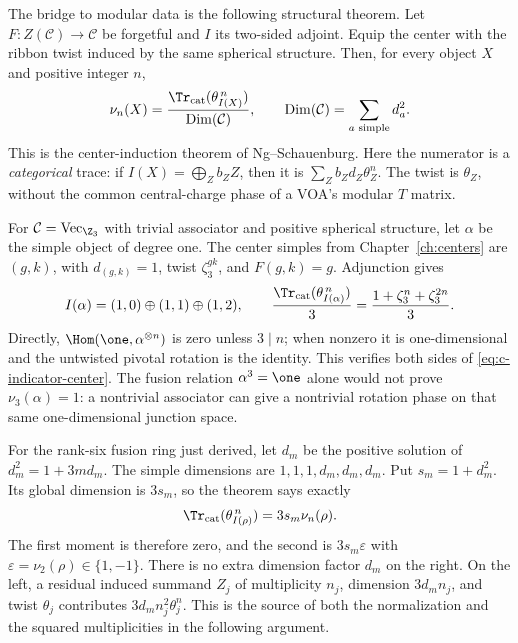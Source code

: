 The bridge to modular data is the following structural theorem.
Let $F:Z(\mathcal C)\to\mathcal C$ be forgetful and $I$ its
two-sided adjoint. Equip the center with the ribbon twist induced
by the same spherical structure. Then, for every object $X$ and
positive integer $n$,
\begin{equation}\label{eq:c-indicator-center}
 \nu_n(X)
 =\frac{\Tr_{\mathrm{cat}}(\theta_{I(X)}^{\,n})}
        {\operatorname{Dim}(\mathcal C)},\qquad
 \operatorname{Dim}(\mathcal C)=\sum_{a\text{ simple}}d_a^2.
\end{equation}
This is the center-induction theorem of Ng--Schauenburg. Here the
numerator is a \emph{categorical} trace: if
$I(X)=\bigoplus_Z b_ZZ$, then it is
$\sum_Z b_Zd_Z\theta_Z^n$. The twist is $\theta_Z$, without the
common central-charge phase of a VOA's modular $T$ matrix.

\begin{example}
For $\mathcal C=\operatorname{Vec}_{\Z_3}$ with trivial associator
and positive spherical structure, let $\alpha$ be the simple object
of degree one. The center simples from Chapter~\ref{ch:centers}
are $(g,k)$, with $d_{(g,k)}=1$, twist $\zeta_3^{gk}$, and
$F(g,k)=g$. Adjunction gives
\[
 I(\alpha)=(1,0)\oplus(1,1)\oplus(1,2),\qquad
 \frac{\Tr_{\mathrm{cat}}(\theta_{I(\alpha)}^{\,n})}{3}
 =\frac{1+\zeta_3^n+\zeta_3^{2n}}3.
\]
Directly, $\Hom(\one,\alpha^{\otimes n})$ is zero unless $3\mid n$;
when nonzero it is one-dimensional and the untwisted pivotal rotation
is the identity. This verifies both sides of
\eqref{eq:c-indicator-center}. The fusion relation $\alpha^3=\one$
alone would not prove $\nu_3(\alpha)=1$: a nontrivial associator
can give a nontrivial rotation phase on that same one-dimensional
junction space.
\end{example}

For the rank-six fusion ring just derived, let $d_m$ be the positive
solution of $d_m^2=1+3md_m$. The simple dimensions are
$1,1,1,d_m,d_m,d_m$. Put $s_m=1+d_m^2$. Its global dimension is
$3s_m$, so the theorem says exactly
\[
 \Tr_{\mathrm{cat}}(\theta_{I(\rho)}^{\,n})
   =3s_m\nu_n(\rho).
\]
The first moment is therefore zero, and the second is
$3s_m\varepsilon$ with $\varepsilon=\nu_2(\rho)\in\{1,-1\}$.
There is no extra dimension factor $d_m$ on the right. On the left,
a residual induced summand $Z_j$ of multiplicity $n_j$, dimension
$3d_mn_j$, and twist $\theta_j$ contributes $3d_mn_j^2\theta_j^n$.
This is the source
of both the normalization and the squared multiplicities in the
following argument.

